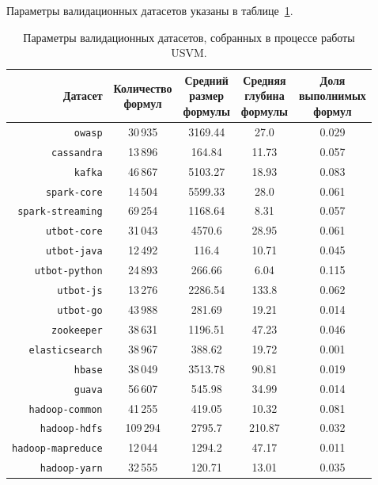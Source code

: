 Параметры валидационных датасетов указаны в таблице~\ref{usvm-val-datasets-table}.

\begin{table}[ht]
\begin{center}
\begin{tabular}{r|cccc}
    Датасет & \makecell{Количество \\ формул} & \makecell{Средний \\ размер \\ формулы} & \makecell{Средняя \\ глубина \\ формулы} & \makecell{Доля \\ выполнимых \\ формул} \\
    \hline \hline
    \rule{0pt}{2.5ex}
    \texttt{owasp}            &  30\,935 & 3169.44 &  27.0  & 0.029 \\
    \texttt{cassandra}        &  13\,896 &  164.84 &  11.73 & 0.057 \\
    \texttt{kafka}            &  46\,867 & 5103.27 &  18.93 & 0.083 \\
    \texttt{spark-core}       &  14\,504 & 5599.33 &  28.0  & 0.061 \\
    \texttt{spark-streaming}  &  69\,254 & 1168.64 &  8.31  & 0.057 \\
    \texttt{utbot-core}       &  31\,043 & 4570.6  &  28.95 & 0.061 \\
    \texttt{utbot-java}       &  12\,492 &  116.4  &  10.71 & 0.045 \\
    \texttt{utbot-python}     &  24\,893 &  266.66 &  6.04  & 0.115 \\
    \texttt{utbot-js}         &  13\,276 & 2286.54 & 133.8  & 0.062 \\
    \texttt{utbot-go}         &  43\,988 &  281.69 &  19.21 & 0.014 \\
    \texttt{zookeeper}        &  38\,631 & 1196.51 &  47.23 & 0.046 \\
    \texttt{elasticsearch}    &  38\,967 &  388.62 &  19.72 & 0.001 \\
    \texttt{hbase}            &  38\,049 & 3513.78 &  90.81 & 0.019 \\
    \texttt{guava}            &  56\,607 &  545.98 &  34.99 & 0.014 \\
    \texttt{hadoop-common}    &  41\,255 &  419.05 &  10.32 & 0.081 \\
    \texttt{hadoop-hdfs}      & 109\,294 & 2795.7  & 210.87 & 0.032 \\
    \texttt{hadoop-mapreduce} &  12\,044 & 1294.2  &  47.17 & 0.011 \\
    \texttt{hadoop-yarn}      &  32\,555 &  120.71 &  13.01 & 0.035 \\
\end{tabular}
\caption{\label{usvm-val-datasets-table} Параметры валидационных датасетов, собранных в процессе работы USVM.}
\end{center}
\end{table}

